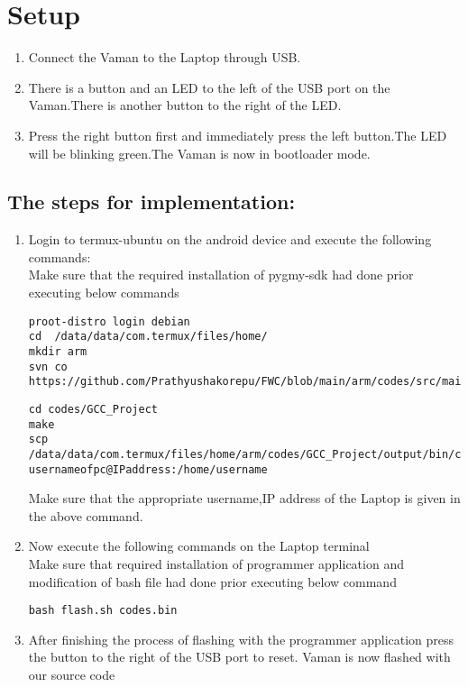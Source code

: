 \documentclass[10pt, a4paper]{article}
\begin{document}
\section{Setup}
\begin{enumerate}
\item Connect the Vaman to the Laptop through USB.
\item There is a button and an LED to the left of the USB port on the Vaman.There is another button to the right of the LED.
\item Press the right button first and immediately press the left button.The LED will be blinking green.The Vaman is now in bootloader mode.
\end{enumerate}
\subsection{The steps for implementation:}
\begin{enumerate}
\item Login to termux-ubuntu on the android device and execute the following commands:\\
Make sure that the required installation of pygmy-sdk had done prior executing below commands
\begin{lstlisting}
proot-distro login debian
cd  /data/data/com.termux/files/home/
mkdir arm
svn co https://github.com/Prathyushakorepu/FWC/blob/main/arm/codes/src/main.c
\end{lstlisting}
\begin{lstlisting}
cd codes/GCC_Project
make
scp /data/data/com.termux/files/home/arm/codes/GCC_Project/output/bin/codes.bin usernameofpc@IPaddress:/home/username
\end{lstlisting}
Make sure that the appropriate username,IP address of the Laptop is given in the above command.
\item Now execute the following commands on the Laptop terminal\\
Make sure that required installation of programmer application and modification of bash file had done prior executing below command
\begin{lstlisting}
bash flash.sh codes.bin
\end{lstlisting}
\item After finishing the process of flashing with the programmer application press the button to the right of the USB port to reset. Vaman is now flashed with our source code
\end{enumerate}
\end{document}
